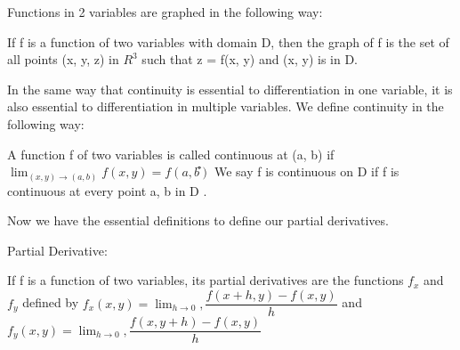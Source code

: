 Functions in 2 variables are graphed in the following way:
\begin{definition}
If f is a function of two variables with domain D, then the graph of
f is the set of all points (x, y, z) in $‬R^3$ such that z = f(x, y) and (x, y) is in D.
\end{definition}

In the same way that continuity is essential to differentiation in one variable, it is also essential to differentiation in multiple variables. We define continuity in the following way:
\begin{definition}
A function f of two variables is called continuous at (a, b) if
$\lim_{{(x,y)} \to {(a,b)}} f(x, y) = f (a, b͒)$
We say f is continuous on D if f is continuous at every point a, b in D .
\end{definition}

Now we have the essential definitions to define our partial derivatives.

\begin{theorem}
Partial Derivative:

If f is a function of two variables, its partial derivatives are the functions $f_x$ and $f_y$ defined by $f_x(x, y) = \lim_{h\to{0}}, \dfrac{f(x+h,y) - f(x,y)}{h}$
and $f_y(x, y) = \lim_{h\to{0}}, \dfrac{f(x,y+h) - f(x,y)}{h}$

\end{theorem}


